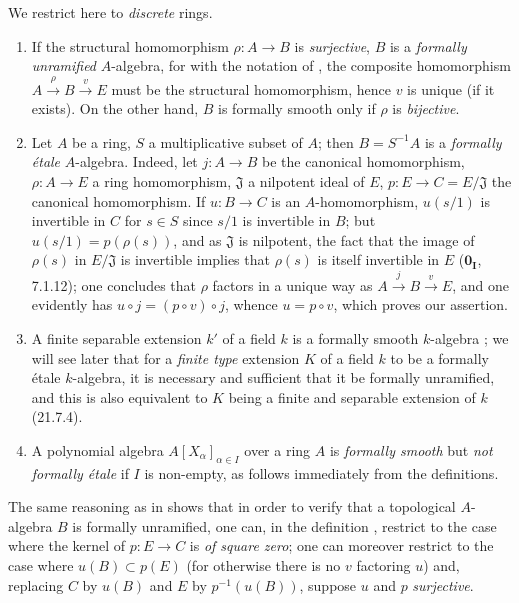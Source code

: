 \begin{examples}[19.10.3]
\label{0.19.10.3}
We restrict here to \emph{discrete} rings.
\begin{enumerate}
  \item[\rm(i)] If the structural homomorphism $\rho:A\to B$ is \emph{surjective}, $B$ is a \emph{formally unramified} $A$-algebra, for with the notation of , the composite homomorphism $A\xrightarrow{\rho}B\xrightarrow{v}E$ must be the structural homomorphism, hence $v$ is unique (if it exists).
On the other hand, $B$ is formally smooth only if $\rho$ is \emph{bijective}.
  \item[\rm(ii)] Let $A$ be a ring, $S$ a multiplicative subset of $A$; then $B=S^{-1}A$ is a \emph{formally \'{e}tale} $A$-algebra.
Indeed, let $j:A\to B$ be the canonical homomorphism, $\rho:A\to E$ a ring homomorphism, $\mathfrak{J}$ a nilpotent ideal of $E$, $p:E\to C=E/\mathfrak{J}$ the canonical homomorphism.
If $u:B\to C$ is an $A$-homomorphism, $u(s/1)$ is invertible in $C$ for $s\in S$ since $s/1$ is invertible in $B$; but $u(s/1)=p(\rho(s))$, and as $\mathfrak{J}$ is nilpotent, the fact that the image of $\rho(s)$ in $E/\mathfrak{J}$ is invertible implies that $\rho(s)$ is itself invertible in $E$ ($\mathbf{0_I}$, 7.1.12); one concludes that $\rho$ factors in a unique way as $A\xrightarrow{j}B\xrightarrow{v}E$, and one evidently has $u\circ j=(p\circ v)\circ j$, whence $u=p\circ v$, which proves our assertion.
  \item[\rm(iii)] A finite separable extension $k'$ of a field $k$ is a formally smooth $k$-algebra ; we will see later that for a \emph{finite type} extension $K$ of a field $k$ to be a formally \'{e}tale $k$-algebra, it is necessary and sufficient that it be formally unramified, and this is also equivalent to $K$ being a finite and separable extension of $k$ (21.7.4).
  \item[\rm(iv)] A polynomial algebra $A[X_\alpha]_{\alpha\in I}$ over a ring $A$ is \emph{formally smooth}  but \emph{not formally \'{e}tale} if $I$ is non-empty, as follows immediately from the definitions.
\end{enumerate}
\end{examples}

\begin{remark}[19.10.4]
\label{0.19.10.4}
The same reasoning as in  shows that in order to verify that a topological $A$-algebra $B$ is formally unramified, one can, in the definition , restrict to the case where the kernel of $p:E\to C$ is \emph{of square zero}; one can moreover restrict to the case where $u(B)\subset p(E)$ (for otherwise there is no $v$ factoring $u$) and, replacing $C$ by $u(B)$ and $E$ by $p^{-1}(u(B))$, suppose $u$ and $p$ \emph{surjective}.
\end{remark}
